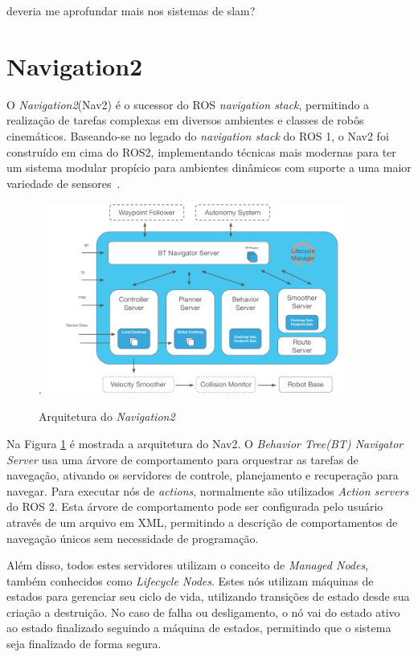 \documentclass[repeatfields,xlists,xpacks,oneside,yearsonly]{ufrgscca}
\begin{document}
{ \color{red} deveria me aprofundar mais nos sistemas de slam? }

\section{Navigation2}

O \textit{Navigation2}(Nav2) é o sucessor do ROS \textit{navigation stack}, permitindo
a realização de tarefas complexas em diversos ambientes e classes de robôs cinemáticos.
Baseando-se no legado do \textit{navigation stack} do ROS 1, o Nav2 foi construído em cima
do ROS2, implementando técnicas mais modernas para ter um sistema modular propício para
ambientes dinâmicos com suporte a uma maior variedade de sensores~\cite{Nav2}.

\begin{figure}[htbp]
    {
        \centering
        \caption{Arquitetura do \textit{Navigation2}}.
        \label{fig:nav2_arc}
        \includegraphics[width=0.9\textwidth]{nav2_architecture.png}\\
    }
    {}
\end{figure}

Na Figura \ref{fig:nav2_arc} é mostrada a arquitetura do Nav2.
O \textit{Behavior Tree(BT) Navigator Server} usa uma árvore de comportamento para
orquestrar as tarefas de navegação, ativando os servidores de controle, planejamento e
recuperação para navegar.
Para executar nós de \textit{actions}, normalmente são utilizados
\textit{Action servers} do ROS 2.
Esta árvore de comportamento pode ser configurada pelo usuário através de um arquivo
em XML, permitindo a descrição de comportamentos de navegação únicos sem
necessidade de programação.

Além disso, todos estes servidores utilizam o conceito de \textit{Managed Nodes},
também conhecidos como \textit{Lifecycle Nodes}.
Estes nós utilizam máquinas de estados para gerenciar seu ciclo de vida, utilizando
transições de estado desde sua criação a destruição.
No caso de falha ou desligamento, o nó vai do estado ativo ao estado finalizado seguindo
a máquina de estados, permitindo que o sistema seja finalizado de forma segura.
\end{document}
